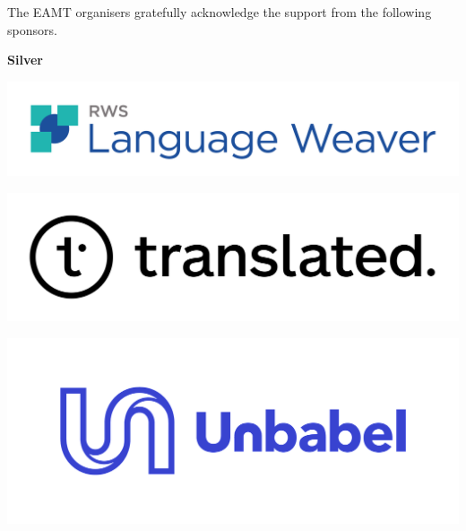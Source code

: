 \documentclass[11pt,oneside]{book}
\begin{document}


\setcounter{page}{62}
{}
\noindent


{\Large The EAMT organisers gratefully acknowledge the support from the following sponsors.}
\bigskip

\vspace*{0.5cm}


    \begin{samepage}
  \noindent
  {\Large \textbf{Silver}}

  \nopagebreak
       \begin{minipage}[c][0.21\linewidth][c]{0.50\linewidth}
        \includegraphics[width=\linewidth]{eamt_volume_1/sponsor_logos/language_weaver.pdf}
      \end{minipage}\hspace{0.05\linewidth}
          \begin{minipage}[c][0.21\linewidth][c]{0.50\linewidth}
        \includegraphics[width=\linewidth]{eamt_volume_1/sponsor_logos/Logo_Translated_Primary.png}
      \end{minipage}\hspace{0.05\linewidth}
          \begin{minipage}[c][0.21\linewidth][c]{0.50\linewidth}
        \includegraphics[width=\linewidth]{eamt_volume_1/sponsor_logos/Unbabel logo.png}
      \end{minipage}\hspace{0.05\linewidth}
    
    \end{samepage}
\end{document}
